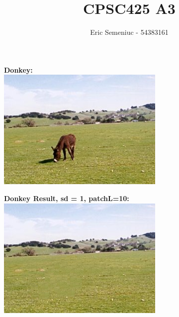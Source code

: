 \documentclass[]{article}
\title{CPSC425 A3}
\author{Eric Semeniuc - 54383161}
\begin{document}
\maketitle
\pagebreak

\textbf{Donkey:}\\
	\includegraphics{donkey.jpg}
	\label{fig:donkey}

\textbf{Donkey Result, sd = 1, patchL=10:}\\
	\includegraphics{donkey_results_sd1.jpg}
	\label{fig:donkey_results}

\pagebreak
\end{document}
